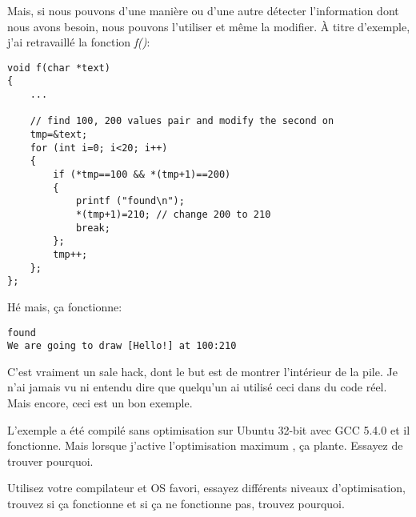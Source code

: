 Mais, si nous pouvons d'une manière ou d'une autre détecter l'information dont nous
avons besoin, nous pouvons l'utiliser et même la modifier.
À titre d'exemple, j'ai retravaillé la fonction \emph{f()}:

\begin{lstlisting}[style=customc]
void f(char *text)
{
	...

	// find 100, 200 values pair and modify the second on
	tmp=&text;
	for (int i=0; i<20; i++)
	{
		if (*tmp==100 && *(tmp+1)==200)
		{
			printf ("found\n");
			*(tmp+1)=210; // change 200 to 210
			break;
		};
		tmp++;
	};
};
\end{lstlisting}

Hé mais, ça fonctionne:

\begin{lstlisting}
found
We are going to draw [Hello!] at 100:210
\end{lstlisting}


C'est vraiment un sale hack, dont le but est de montrer l'intérieur de la pile.
Je n'ai jamais vu ni entendu dire que quelqu'un ai utilisé ceci dans du code réel.
Mais encore, ceci est un bon exemple.

\myparagraph{\Exercise}

L'exemple a été compilé sans optimisation sur Ubuntu 32-bit avec GCC 5.4.0 et il
fonctionne.
Mais lorsque j'active l'optimisation maximum , ça plante.
Essayez de trouver pourquoi.

Utilisez votre compilateur et OS favori, essayez différents niveaux d'optimisation,
trouvez si ça fonctionne et si ça ne fonctionne pas, trouvez pourquoi.
